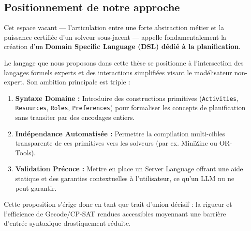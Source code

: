 \subsection{Positionnement de notre approche}
Cet espace vacant — l'articulation entre une forte abstraction métier et la puissance certifiée d'un solveur sous-jacent — appelle fondamentalement la création d'un \textbf{Domain Specific Language (DSL) dédié à la planification}. 

Le langage que nous proposons dans cette thèse se positionne à l'intersection des langages formels experts et des interactions simplifiées visant le modélisateur non-expert. Son ambition principale est triple :
\begin{enumerate}
    \item \textbf{Syntaxe Domaine : } Introduire des constructions primitives (\texttt{Activities}, \texttt{Resources}, \texttt{Roles}, \texttt{Preferences}) pour formaliser les concepts de planification sans transiter par des encodages entiers.
    \item \textbf{Indépendance Automatisée : } Permettre la compilation multi-cibles transparente de ces primitives vers les solveurs (par ex. MiniZinc ou OR-Tools).
    \item \textbf{Validation Précoce : } Mettre en place un Server Language offrant une aide statique et des garanties contextuelles à l'utilisateur, ce qu'un LLM nu ne peut garantir.
\end{enumerate}
Cette proposition s'érige donc en tant que trait d'union décisif : la rigueur et l'efficience de Gecode/CP-SAT rendues accessibles moyennant une barrière d'entrée syntaxique drastiquement réduite.